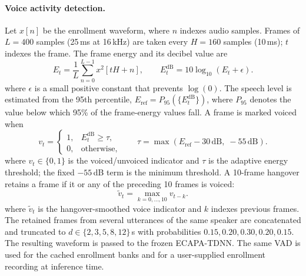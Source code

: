 \documentclass[11pt,a4paper]{article}
\begin{document}
\paragraph{Voice activity detection.}
Let $x[n]$ be the enrollment waveform, where $n$ indexes audio samples. Frames of $L=400$ samples
(25\,ms at 16\,kHz) are taken every $H=160$ samples (10\,ms); $t$ indexes the frame. The frame
energy and its decibel value are
\begin{equation}
  E_t=\frac{1}{L}\sum_{n=0}^{L-1}x^2[tH+n],
  \qquad
  E_t^{\mathrm{dB}}=10\log_{10}(E_t+\epsilon).
\end{equation}
where $\epsilon$ is a small positive constant that prevents $\log(0)$. The speech level is
estimated from the 95th percentile,
$E_{\mathrm{ref}}=P_{95}(\{E_t^{\mathrm{dB}}\})$, where $P_{95}$ denotes the value below which
95\% of the frame-energy values fall. A frame is marked voiced when
\begin{equation}
  v_t=
  \begin{cases}
    1, & E_t^{\mathrm{dB}}\ge \tau,\\
    0, & \text{otherwise},
  \end{cases}
  \qquad
  \tau=\max\left(E_{\mathrm{ref}}-30\,\mathrm{dB},\;-55\,\mathrm{dB}\right).
  \label{eq:vad}
\end{equation}
where $v_t\in\{0,1\}$ is the voiced/unvoiced indicator and $\tau$ is the adaptive energy
threshold; the fixed $-55$\,dB term is the minimum threshold. A 10-frame hangover retains a frame
if it or any of the preceding 10 frames is voiced:
\begin{equation}
  \tilde{v}_t=\max_{k=0,\ldots,10} v_{t-k}.
\end{equation}
where $\tilde v_t$ is the hangover-smoothed voice indicator and $k$ indexes previous frames. The
retained frames from several utterances of the same speaker are concatenated and truncated
to $d\in\{2,3,5,8,12\}$\,s with probabilities $0.15,0.20,0.30,0.20,0.15$. The resulting waveform
is passed to the frozen ECAPA-TDNN. The same VAD is used for the cached enrollment banks and for
a user-supplied enrollment recording at inference time.
\end{document}
